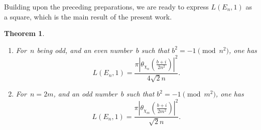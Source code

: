 \documentclass[11pt, reqno]{amsart}
\theoremstyle{plain}
\newtheorem{theorem}{Theorem}[section]
\theoremstyle{definition}
\numberwithin{equation}{section}
\begin{document}
Building upon the preceding preparations,  we are ready to  express $L(E_{n},1)$ as a square, which is the main result of the present work.


\begin{theorem}\label{main4}
\begin{enumerate}
    \item For~$n$ being odd, and an even number~$b$ such that $b^{2}=-1\pmod{n^{2}}$, one has
    \[
L(E_n,1)=\frac{\pi \left|\theta_{\chi_{n}}\left(\frac{b+i}{2
n^2}\right)\right|^2}{4\sqrt{2}n }.
\]

\item For~$n=2m$, and an odd number~$b$ such that $b^{2}=-1\pmod{m^{2}}$, one has
    \[
L(E_n,1)=\frac{\pi \left|\theta_{\chi_{m}}\left(\frac{b+i}{2
m^2}\right)\right|^2}{\sqrt{2}n }.
\]
\end{enumerate}

\end{theorem}
\end{document}
